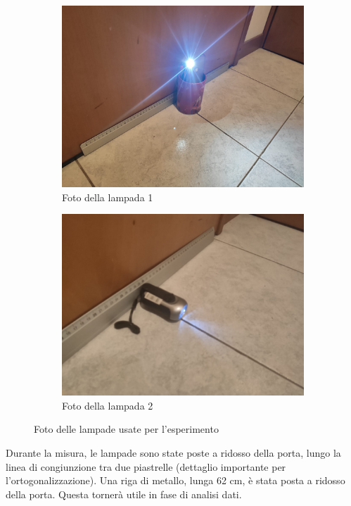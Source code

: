 \documentclass{article}
\begin{document}
\begin{figure}[h]
  \centering
  \begin{subfigure}[b]{0.4\linewidth}
    \includegraphics[width=\linewidth]{IM_foto_lamp_1}
    \caption{Foto della lampada 1}
  \end{subfigure}
  \begin{subfigure}[b]{0.4\linewidth}
    \includegraphics[width=\linewidth]{IM_foto_lamp_2}
    \caption{Foto della lampada 2}
  \end{subfigure}
  \caption{Foto delle lampade usate per l'esperimento}
\end{figure}

Durante la misura, le lampade sono state poste a ridosso della porta, lungo la linea di congiunzione tra due piastrelle (dettaglio importante per l'ortogonalizzazione). Una riga di metallo, lunga 62 cm, è stata posta a ridosso della porta. Questa tornerà utile in fase di analisi dati.
\end{document}
